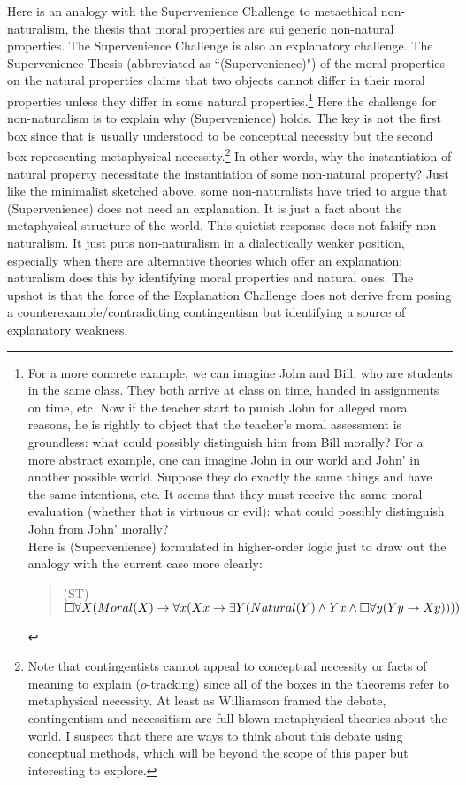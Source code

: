 Here is an analogy with the Supervenience Challenge to metaethical non-naturalism, the thesis that moral properties are sui generic non-natural properties. The Supervenience Challenge is also an explanatory challenge. The Supervenience Thesis (abbreviated as ``(Supervenience)") of the moral properties on the natural properties claims that two objects cannot differ in their moral properties unless they differ in some natural properties.\footnote{For a more concrete example, we can imagine John and Bill, who are students in the same class. They both arrive at class on time, handed in assignments on time, etc. Now if the teacher start to punish John for alleged moral reasons, he is rightly to object that the teacher's moral assessment is groundless: what could possibly distinguish him from Bill morally? For a more abstract example, one can imagine John in our world and John' in another possible world. Suppose they do exactly the same things and have the same intentions, etc. It seems that they must receive the same moral evaluation (whether that is virtuous or evil): what could possibly distinguish John from John' morally? \\
Here is (Supervenience) formulated in higher-order logic just to draw out the analogy with the current case more clearly: 
\begin{quote}
(ST) \hspace{\labelsep} $\Box \forall X (Moral(X) \rightarrow \forall x (Xx \rightarrow \exists Y (Natural(Y) \wedge Yx \wedge \Box \forall y (Yy \rightarrow Xy))))$
\end{quote}} 
Here the challenge for non-naturalism is to explain why (Supervenience) holds. The key is not the first box since that is usually understood to be conceptual necessity but the second box representing metaphysical necessity.\footnote{Note that contingentists cannot appeal to conceptual necessity or facts of meaning to explain ($o$-tracking) since all of the boxes in the theorems refer to metaphysical necessity. At least as Williamson framed the debate, contingentism and necessitism are full-blown metaphysical theories about the world. I suspect that there are ways to think about this debate using conceptual methods, which will be beyond the scope of this paper but interesting to explore.}
In other words, why the instantiation of natural property necessitate the instantiation of some non-natural property? Just like the minimalist sketched above, some non-naturalists have tried to argue that (Supervenience) does not need an explanation. It is just a fact about the metaphysical structure of the world. This quietist response does not falsify non-naturalism. It just puts non-naturalism in a dialectically weaker position, especially when there are alternative theories which offer an explanation: naturalism does this by identifying moral properties and natural ones. 
The upshot is that the force of the Explanation Challenge does not derive from posing a counterexample/contradicting contingentism but identifying a source of explanatory weakness.
 

